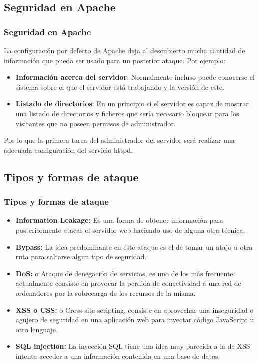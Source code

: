 \documentclass{beamer}
\begin{document}
	\subsection{Seguridad en Apache}
	\begin{frame}
	\frametitle{Seguridad en Apache}
La configuración por defecto de Apache deja al descubierto mucha cantidad de información que pueda ser usado para un posterior ataque. Por ejemplo:
	\begin{itemize}
		\item \textbf{Información acerca del servidor}: Normalmente incluso puede conocerse el sistema sobre el que el servidor está trabajando y la versión de este.
		\item \textbf{Listado de directorios}: En un principio si el servidor es capaz de mostrar una listado de directorios y ficheros que sería necesario bloquear para los visitantes que no poseen permisos de administrador.
	\end{itemize}
	Por lo que la primera tarea del administrador del servidor será realizar una adecuada configuración del servicio httpd. 
	\end{frame}

	\subsection{Tipos y formas de ataque}
	\begin{frame}
	\frametitle{Tipos y formas de ataque}
	\begin{itemize}
\item \textbf{Information Leakage:} Es una forma de obtener información para posteriormente atacar el servidor web haciendo uso de alguna otra técnica.
\item \textbf{Bypass:} La idea predominante en este ataque es el de tomar un atajo u otra ruta para saltarse algun tipo de seguridad.
\item \textbf{DoS:} o Ataque de denegación de servicios, es uno de los más frecuente actualmente consiste en provocar la perdida de conectividad a una red de ordenadores por la sobrecarga de los recursos de la misma.
\item \textbf{XSS o CSS:} o Cross-site scripting, consiste en aprovechar una inseguridad o agujero de seguridad en una aplicación web para inyectar código JavaScript u otro lenguaje.
\item \textbf{SQL injection:} La inyección SQL tiene una idea muy parecida a la de XSS intenta acceder a una información contenida en una base de datos.
\end{itemize}
	\end{frame}
\end{document}
